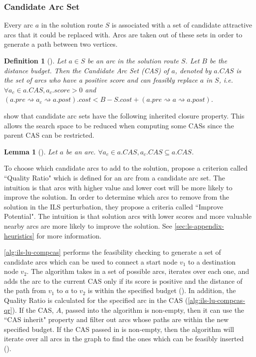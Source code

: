 \documentclass[honors]{union-cs-thesis}
\newtheorem{lemma}{Lemma}
\newtheorem{definition}{Definition}
\newcommand{\sse}{\subseteq} %
\newcommand{\spa}{\rightsquigarrow}
\begin{document}
\subsubsection{Candidate Arc Set}
Every arc $a$ in the solution route $S$ is associated with a set of candidate attractive arcs that it could be replaced with. Arcs are taken out of these sets in order to generate a path between two vertices.
%
%
\begin{definition}[\cite{lu2015arc}]
    Let $a \in S$ be an arc in the solution route $S$. Let $B$ be the distance budget. Then the Candidate Arc Set (CAS) of $a$, denoted by $a.CAS$ is the set of arcs who have a positive score and can feasibly replace $a$ in $S$, i.e. $\forall a_c \in a.CAS, a_c.score > 0$ and $(a.pre \spa a_c \spa a.post).cost < B - S.cost + (a.pre \spa a \spa a.post)$.
\end{definition}

\citeauthor{lu2015arc} show that candidate arc sets have the following inherited closure property. This allows the search space to be reduced when computing some CASs since the parent CAS can be restricted.
\begin{lemma}[\cite{lu2015arc}] Let $a$ be an arc. $\forall a_c \in a.CAS, a_c.CAS \sse a.CAS$.
\end{lemma}

To choose which candidate arcs to add to the solution, \citeauthor{lu2015arc} propose a criterion called ``Quality Ratio" which is defined for an arc from a candidate arc set. The intuition is that arcs with higher value and lower cost will be more likely to improve the solution. In order to determine which arcs to remove from the solution in the ILS perturbation, they propose a criteria called ``Improve Potential". The intuition is that solution arcs with lower scores and more valuable nearby arcs are more likely to improve the solution. See \cref{sec:ls-appendix-heuristics} for more information.

\cref{alg:ils-lu-compcas} performs the feasibility checking to generate a set of candidate arcs which can be used to connect a start node $v_1$ to a destination node $v_2$. The algorithm takes in a set of possible arcs, iterates over each one, and adds the arc to the current CAS only if its score is positive and the distance of the path from $v_1$ to $a$ to $v_2$ is within the specified budget (). In addition, the Quality Ratio is calculated for the specified arc in the CAS (\cref{alg:ils-lu-compcas-qr}). If the CAS, $A$, passed into the algorithm is non-empty, then it can use the ``CAS inherit" property and filter out arcs whose paths are within the new specified budget. If the CAS passed in is non-empty, then the algorithm will iterate over all arcs in the graph to find the ones which can be feasibly inserted ().
\end{document}
